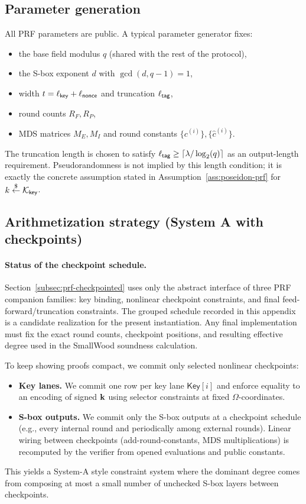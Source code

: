 \subsection{Parameter generation}
All PRF parameters are public. A typical parameter generator fixes:
\begin{itemize}[leftmargin=1.25em]
  \item the base field modulus \(q\) (shared with the rest of the protocol),
  \item the S-box exponent \(d\) with \(\gcd(d,q-1)=1\),
  \item width \(t=\ell_{\mathsf{key}}+\ell_{\mathsf{nonce}}\) and truncation \(\ell_{\mathsf{tag}}\),
  \item round counts \(R_F,R_P\),
  \item MDS matrices \(M_E,M_I\) and round constants \(\{c^{(i)}\},\{\hat c^{(i)}\}\).
\end{itemize}
The truncation length is chosen to satisfy
\(\ell_{\mathsf{tag}}\ge \lceil \lambda/\log_2(q)\rceil\) as an output-length requirement.  Pseudorandomness is
not implied by this length condition; it is exactly the concrete assumption stated in
Assumption~\ref{ass:poseidon-prf} for \(k\overset{\$}{\leftarrow}\mathcal K_{\mathsf{key}}\).

\subsection{Arithmetization strategy (System A with checkpoints)}
\paragraph{Status of the checkpoint schedule.}
Section~\ref{subsec:prf-checkpointed} uses only the abstract interface of three PRF companion families: key binding,
nonlinear checkpoint constraints, and final feed-forward/truncation constraints. The grouped schedule recorded in this
appendix is a candidate realization for the present instantiation.  Any final implementation must fix the exact
round counts, checkpoint positions, and resulting effective degree used in the SmallWood soundness calculation.

To keep showing proofs compact, we commit only selected nonlinear checkpoints:
\begin{itemize}[leftmargin=1.25em]
  \item \textbf{Key lanes.} We commit one row per key lane \(\mathsf{Key}[i]\) and enforce equality to an encoding of
  signed \(\mathbf{k}\) using selector constraints at fixed \(\Omega\)-coordinates.
  \item \textbf{S-box outputs.} We commit only the S-box outputs at a checkpoint schedule (e.g., every internal round and
  periodically among external rounds). Linear wiring between checkpoints (add-round-constants, MDS multiplications) is
  recomputed by the verifier from opened evaluations and public constants.
\end{itemize}
This yields a System-A style constraint system where the dominant degree comes from composing at most a small number of
unchecked S-box layers between checkpoints.

